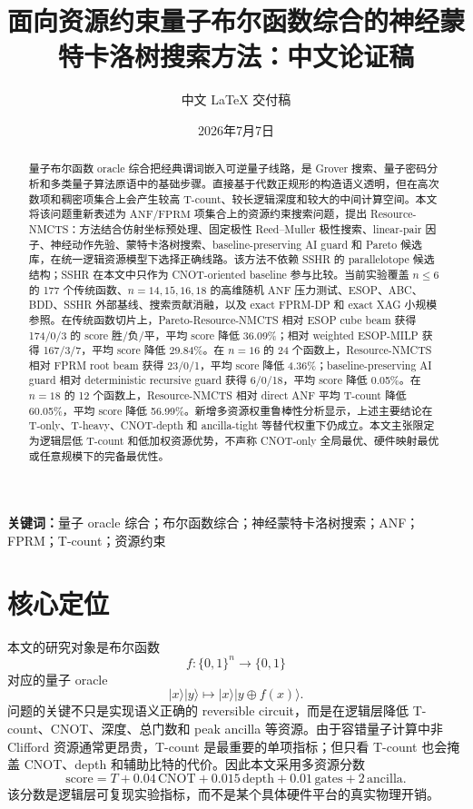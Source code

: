 \documentclass[UTF8,fontset=macnew,11pt]{ctexart}
\title{面向资源约束量子布尔函数综合的神经蒙特卡洛树搜索方法：中文论证稿}
\author{中文 LaTeX 交付稿}
\date{2026年7月7日}
\newcommand{\method}{Resource-NMCTS}
\newcommand{\pareto}{Pareto-Resource-NMCTS}
\newcommand{\score}{\ensuremath{\mathrm{score}}}
\newcommand{\anf}{\ensuremath{\mathrm{ANF}}}
\newcommand{\fprm}{\ensuremath{\mathrm{FPRM}}}
\begin{document}
\maketitle

\begin{abstract}
量子布尔函数 oracle 综合把经典谓词嵌入可逆量子线路，是 Grover 搜索、量子密码分析和多类量子算法原语中的基础步骤。直接基于代数正规形的构造语义透明，但在高次数项和稠密项集合上会产生较高 T-count、较长逻辑深度和较大的中间计算空间。本文将该问题重新表述为 \anf{}/\fprm{} 项集合上的资源约束搜索问题，提出 \method{}：方法结合仿射坐标预处理、固定极性 Reed--Muller 极性搜索、linear-pair 因子、神经动作先验、蒙特卡洛树搜索、baseline-preserving AI guard 和 Pareto 候选库，在统一逻辑资源模型下选择正确线路。该方法不依赖 SSHR 的 parallelotope 候选结构；SSHR 在本文中只作为 CNOT-oriented baseline 参与比较。当前实验覆盖 $n\leq6$ 的 177 个传统函数、$n=14,15,16,18$ 的高维随机 \anf{} 压力测试、ESOP、ABC、BDD、SSHR 外部基线、搜索贡献消融，以及 exact FPRM-DP 和 exact XAG 小规模参照。在传统函数切片上，\pareto{} 相对 ESOP cube beam 获得 174/0/3 的 score 胜/负/平，平均 score 降低 36.09\%；相对 weighted ESOP-MILP 获得 167/3/7，平均 score 降低 29.84\%。在 $n=16$ 的 24 个函数上，\method{} 相对 FPRM root beam 获得 23/0/1，平均 score 降低 4.36\%；baseline-preserving AI guard 相对 deterministic recursive guard 获得 6/0/18，平均 score 降低 0.05\%。在 $n=18$ 的 12 个函数上，\method{} 相对 direct ANF 平均 T-count 降低 60.05\%，平均 score 降低 56.99\%。新增多资源权重鲁棒性分析显示，上述主要结论在 T-only、T-heavy、CNOT-depth 和 ancilla-tight 等替代权重下仍成立。本文主张限定为逻辑层低 T-count 和低加权资源优势，不声称 CNOT-only 全局最优、硬件映射最优或任意规模下的完备最优性。
\end{abstract}

\noindent\textbf{关键词：}量子 oracle 综合；布尔函数综合；神经蒙特卡洛树搜索；ANF；FPRM；T-count；资源约束

\section{核心定位}

本文的研究对象是布尔函数
\[
  f:\{0,1\}^{n}\rightarrow\{0,1\}
\]
对应的量子 oracle
\[
  |x\rangle|y\rangle\mapsto |x\rangle|y\oplus f(x)\rangle .
\]
问题的关键不只是实现语义正确的 reversible circuit，而是在逻辑层降低 T-count、CNOT、深度、总门数和 peak ancilla 等资源。由于容错量子计算中非 Clifford 资源通常更昂贵，T-count 是最重要的单项指标；但只看 T-count 也会掩盖 CNOT、depth 和辅助比特的代价。因此本文采用多资源分数
\begin{equation}
  \score = T + 0.04\,\mathrm{CNOT} + 0.015\,\mathrm{depth}
         + 0.01\,\mathrm{gates} + 2\,\mathrm{ancilla}.
  \label{eq:score}
\end{equation}
该分数是逻辑层可复现实验指标，而不是某个具体硬件平台的真实物理开销。
\end{document}
